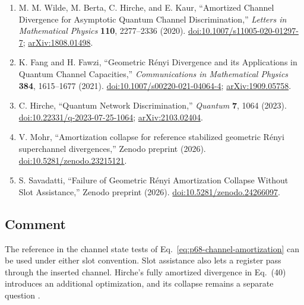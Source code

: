 \begin{enumerate}[label={},leftmargin=4.8em,labelsep=0.5em]
  \footnotesize
  \item[\textup{[WBHK20]}]\label{ref:p68-wilde-berta-hirche-kaur}
  M. M. Wilde, M. Berta, C. Hirche, and E. Kaur,
  ``Amortized Channel Divergence for Asymptotic Quantum Channel
  Discrimination,'' \emph{Letters in Mathematical Physics} \textbf{110},
  2277--2336 (2020).
  \href{https://doi.org/10.1007/s11005-020-01297-7}{doi:10.1007/s11005-020-01297-7};
  \href{https://arxiv.org/abs/1808.01498}{arXiv:1808.01498}.

  \item[\textup{[FF21]}]\label{ref:p68-fang-fawzi}
  K. Fang and H. Fawzi,
  ``Geometric R\'enyi Divergence and its Applications in Quantum Channel
  Capacities,'' \emph{Communications in Mathematical Physics} \textbf{384},
  1615--1677 (2021).
  \href{https://doi.org/10.1007/s00220-021-04064-4}{doi:10.1007/s00220-021-04064-4};
  \href{https://arxiv.org/abs/1909.05758}{arXiv:1909.05758}.

  \item[\textup{[Hir23]}]\label{ref:p68-hirche}
  C. Hirche, ``Quantum Network Discrimination,''
  \emph{Quantum} \textbf{7}, 1064 (2023).
  \href{https://doi.org/10.22331/q-2023-07-25-1064}{doi:10.22331/q-2023-07-25-1064};
  \href{https://arxiv.org/abs/2103.02404}{arXiv:2103.02404}.

  \item[\textup{[Moh26]}]\label{ref:p68-mohr26}
  V. Mohr, ``Amortization collapse for reference stabilized geometric
  R\'enyi superchannel divergences,'' Zenodo preprint (2026).
  \href{https://doi.org/10.5281/zenodo.23215121}{doi:10.5281/zenodo.23215121}.

  \item[\textup{[Sav26]}]\label{ref:p68-savadatti26}
  S. Savadatti, ``Failure of Geometric R\'enyi Amortization Collapse
  Without Slot Assistance,'' Zenodo preprint (2026).
  \href{https://doi.org/10.5281/zenodo.24266097}{doi:10.5281/zenodo.24266097}.
\end{enumerate}

\subsection*{Comment}

The reference in the channel state tests of
Eq.~\eqref{eq:p68-channel-amortization} can be used under either slot
convention. Slot assistance also lets a register pass through the
inserted channel. Hirche's fully amortized divergence in Eq.~(40)
introduces an additional optimization, and its collapse remains a
separate question .

